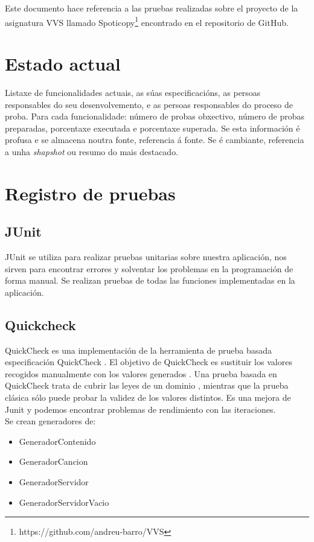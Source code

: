 \documentclass[12pt, a4paper, titlepage]{article}
\begin{document}
Este documento hace referencia a las pruebas realizadas sobre el proyecto de la asignatura VVS llamado Spoticopy\footnote{https://github.com/andreu-barro/VVS} encontrado en el repositorio de GitHub.

\section{Estado actual}

Listaxe de funcionalidades actuais, as súas especificacións, as persoas responsables do seu desenvolvemento, e as persoas responsables do proceso de proba.  Para cada funcionalidade: número de probas obxectivo, número de probas preparadas, porcentaxe executada e porcentaxe superada. Se esta información é profusa e se almacena noutra fonte, referencia á fonte. Se é cambiante, referencia a unha \emph{shapshot} ou resumo do mais destacado.

\section{Registro de pruebas}
\subsection{JUnit}
JUnit se utiliza para realizar pruebas unitarias sobre nuestra aplicación, nos sirven para encontrar errores y solventar los problemas en la programación de forma manual.
Se realizan pruebas de todas las funciones implementadas en la aplicación.
\subsection{Quickcheck}
QuickCheck es una implementación de la herramienta de prueba basada especificación QuickCheck .
El objetivo de QuickCheck es sustituir los valores recogidos manualmente con los valores generados . Una prueba basada en QuickCheck trata de cubrir las leyes de un dominio , mientras que la prueba clásica sólo puede probar la validez de los valores distintos. Es una mejora de Junit y podemos encontrar problemas de rendimiento con las iteraciones. \\
Se crean generadores de:
\begin{itemize}
	\item GeneradorContenido
	\item GeneradorCancion
	\item GeneradorServidor
	\item GeneradorServidorVacio
\end{itemize}
\end{document}
